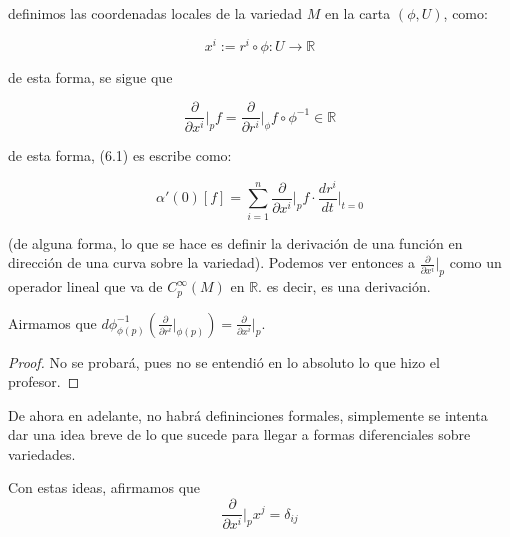 \documentclass[12pt]{report}
\theoremstyle{largebreak}
\newcommand{\cf}[3]{\ensuremath{#1:#2\rightarrow#3}}
\begin{document}
    definimos las coordenadas locales de la variedad $M$ en la carta $(\phi, U)$, como:

    \begin{equation*}
        x^i:=\cf{r^i\circ\phi}{U}{\mathbb{R}}
    \end{equation*}

    de esta forma, se sigue que

    \begin{equation*}
        \frac{\partial}{\partial x^i}\Big|_{p}f=\frac{\partial}{\partial r^i}\Big|_{\phi}f\circ\phi^{-1}\in\mathbb{R}
    \end{equation*}

    de esta forma, (6.1) es escribe como:

    \begin{equation*}
        \alpha'(0)[f]=\sum_{i=1}^{n}\frac{\partial}{\partial x^i}\Big|_{p}f\cdot\frac{dr^i}{dt}\Big|_{t=0}
    \end{equation*}

    (de alguna forma, lo que se hace es definir la derivación de una función en dirección de una curva sobre la variedad). Podemos ver entonces a $\frac{\partial}{\partial x^i}\Big|_{p}$ como un operador lineal que va de $C_p^{\infty}(M)$ en $\mathbb{R}$. es decir, es una derivación.

    \begin{obs}
        Airmamos que $d\phi^{-1}_{\phi(p)}(\frac{\partial}{\partial r^i}\Big|_{\phi(p)})=\frac{\partial}{\partial x^i}\Big|_{p}$.
    \end{obs}

    \begin{proof}
        No se probará, pues no se entendió en lo absoluto lo que hizo el profesor.
    \end{proof}

    De ahora en adelante, no habrá defininciones formales, simplemente se intenta dar una idea breve de lo que sucede para llegar a formas diferenciales sobre variedades.

    \begin{obs}
        Con estas ideas, afirmamos que
        \begin{equation*}
            \frac{\partial}{\partial x^i}\Big|_{p}x^j=\delta_{ij}
        \end{equation*}
    \end{obs}
\end{document}
